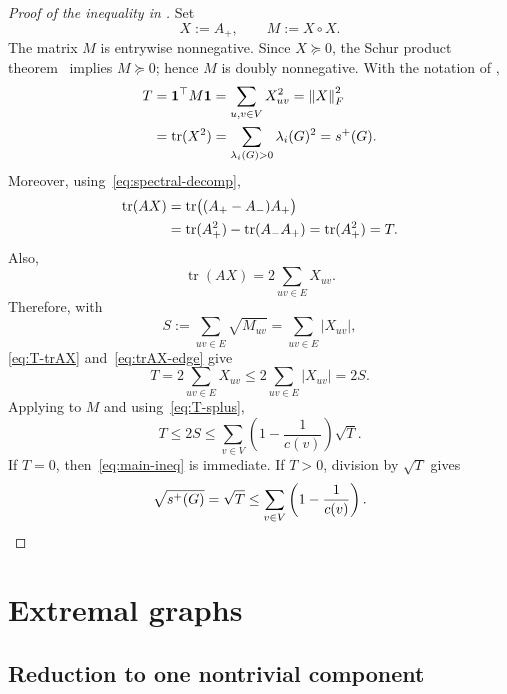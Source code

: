 \documentclass[11pt]{article}
\numberwithin{equation}{section}
\theoremstyle{definition}
\theoremstyle{remark}
\DeclareMathOperator{\tr}{tr}
\newcommand{\one}{\mathbf 1}
\newcommand{\splus}{s^{+}}
\newcommand{\Aplus}{A_{+}}
\newcommand{\Aminus}{A_{-}}
\newcommand{\norm}[1]{\left\lVert #1\right\rVert}
\begin{document}
	\begin{proof}[Proof of the inequality in ]
		Set
		\begin{equation}\label{eq:spectral-M}
			X:=\Aplus,
			\qquad
			M:=X\circ X.
		\end{equation}
		The matrix $M$ is entrywise nonnegative.  Since $X\succeq0$, the Schur
		product theorem~\cite[Theorem~7.5.3]{MR2978290} implies $M\succeq0$;
		hence $M$ is doubly nonnegative.  With the notation of
		,
		\begin{align}
			T
			&=\one^{\top}M\one
			=\sum_{u,v\in V}X_{uv}^2
			=\norm{X}_F^2 \notag\\
			&=\tr(X^2)
			=\sum_{\lambda_i(G)>0}\lambda_i(G)^2
			=\splus(G).
			\label{eq:T-splus}
		\end{align}
		Moreover, using~\eqref{eq:spectral-decomp},
		\begin{align}
			\tr(AX)
			&=\tr\bigl((\Aplus-\Aminus)\Aplus\bigr) \notag\\
			&=\tr(\Aplus^2)-\tr(\Aminus\Aplus)
			=\tr(\Aplus^2)
			=T.
			\label{eq:T-trAX}
		\end{align}
		Also,
		\begin{equation}\label{eq:trAX-edge}
			\tr(AX)=2\sum_{uv\in E}X_{uv}.
		\end{equation}
		Therefore, with
		\[
		S:=\sum_{uv\in E}\sqrt{M_{uv}}
		=\sum_{uv\in E}|X_{uv}|,
		\]
		\eqref{eq:T-trAX} and~\eqref{eq:trAX-edge} give
		\begin{equation}\label{eq:T-le-2S}
			T
			=2\sum_{uv\in E}X_{uv}
			\leq
			2\sum_{uv\in E}|X_{uv}|
			=2S.
		\end{equation}
		Applying  to $M$ and using~\eqref{eq:T-splus},
		\[
		T\leq2S\leq\sum_{v\in V}\left(1-\frac1{c(v)}\right)\sqrt{T}.
		\]
		If $T=0$, then~\eqref{eq:main-ineq} is immediate.  If $T>0$, division by
		$\sqrt{T}$ gives
		\[
		\sqrt{\splus(G)}=\sqrt{T}\leq\sum_{v\in V}\left(1-\frac1{c(v)}\right). \qedhere
		\]
	\end{proof}
	
	\section{Extremal graphs}\label{sec:equality}
	
	\subsection{Reduction to one nontrivial component}
	
\end{document}
